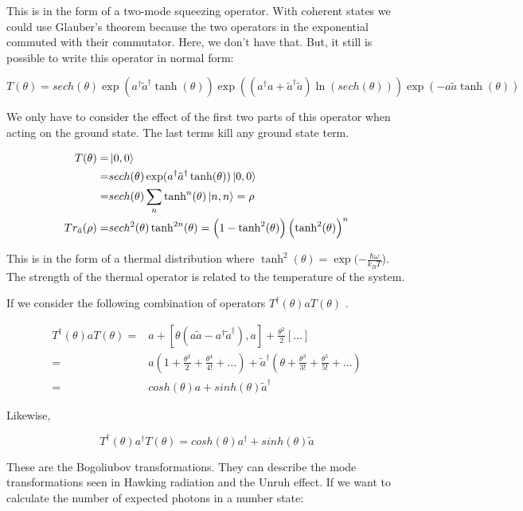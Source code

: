 \documentclass{article}
\begin{document}
This is in the form of a two-mode squeezing operator. With coherent states we
could use Glauber's theorem because the two operators in the exponential
commuted with their commutator. Here, we don't have that. But, it still is
possible to write this operator in normal form:

\[
   T(\theta) = sech(\theta) \exp(a^\dagger \tilde{a}^\dagger \tanh(\theta))
   \exp((a^\dagger a + \tilde{a}^\dagger \tilde{a})\ln(sech(\theta))) \exp(-a
   \tilde{a} \tanh(\theta))
\]

We only have to consider the effect of the first two parts of this operator when
acting on the ground state. The last terms kill any ground state term.

\begin{align*}
   T(\theta) =& \Ket{0,0} \\
   =& sech(\theta) \exp(a^\dagger \tilde{a}^\dagger \tanh(\theta)) \Ket{0,0} \\
   =& sech(\theta) \sum_n \tanh^n(\theta) \Ket{n,n} = \rho \\
   Tr_{\tilde{a}}(\rho) =& sech^2(\theta)\tanh^{2n}(\theta) = \left( 1-
\tanh^2(\theta) \right) \left( \tanh^2(\theta) \right)^n \\
\end{align*}

This is in the form of a thermal distribution where $ \tanh^2(\theta) =
\exp(-\frac{\hbar \omega}{k_B T}$). The strength of the thermal operator is related
to the temperature of the system.

If we consider the following combination of operators $ T^\dagger(\theta) a
T(\theta) $ .

\begin{align*}
   T^\dagger(\theta) a T(\theta) =& a + \left[ \theta \left( a \tilde{a} -
   a^\dagger \tilde{a}^\dagger \right), a \right] + \frac{\theta^2}{2} \left[
\ldots \right] \\
=& a \left( 1 + \frac{\theta^2}{2} + \frac{\theta^4}{4!} + \ldots \right) +
\tilde{a}^\dagger \left( \theta + \frac{\theta^3}{3!} + \frac{\theta^5}{5!} +
\ldots \right) \\
=& cosh(\theta)a + sinh(\theta) \tilde{a}^\dagger
\end{align*}

Likewise,

\[
   T^\dagger(\theta) a^\dagger T(\theta) = cosh(\theta) a^\dagger +
   sinh(\theta) \tilde{a}
\]

These are the Bogoliubov transformations. They can describe the mode
transformations seen in Hawking radiation and the Unruh effect. If we want to
calculate the number of expected photons in a number state:
\end{document}
